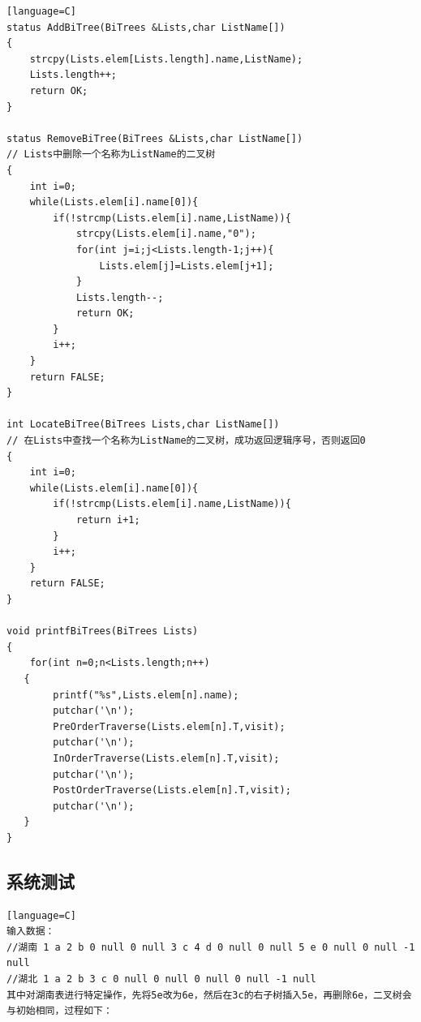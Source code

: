 \documentclass[supercite]{Experimental_Report}
\theoremstyle{definition}
\begin{document}
\begin{sloppypar}
\begin{lstlisting}[breaklines][language=C]
status AddBiTree(BiTrees &Lists,char ListName[])
{
    strcpy(Lists.elem[Lists.length].name,ListName);
    Lists.length++;
	return OK;
}

status RemoveBiTree(BiTrees &Lists,char ListName[])
// Lists中删除一个名称为ListName的二叉树
{
    int i=0;
    while(Lists.elem[i].name[0]){
        if(!strcmp(Lists.elem[i].name,ListName)){
        	strcpy(Lists.elem[i].name,"0");
            for(int j=i;j<Lists.length-1;j++){
                Lists.elem[j]=Lists.elem[j+1];
            }
            Lists.length--;
            return OK;
        }
        i++;
    }
    return FALSE;
}

int LocateBiTree(BiTrees Lists,char ListName[])
// 在Lists中查找一个名称为ListName的二叉树，成功返回逻辑序号，否则返回0
{
    int i=0;
    while(Lists.elem[i].name[0]){
        if(!strcmp(Lists.elem[i].name,ListName)){
            return i+1;
        }
        i++;
    }
    return FALSE;
}

void printfBiTrees(BiTrees Lists)
{
	for(int n=0;n<Lists.length;n++)
   {
   		printf("%s",Lists.elem[n].name);
		putchar('\n');
   		PreOrderTraverse(Lists.elem[n].T,visit);
		putchar('\n');
		InOrderTraverse(Lists.elem[n].T,visit);
		putchar('\n');
		PostOrderTraverse(Lists.elem[n].T,visit);
        putchar('\n');
   }
}

\end{lstlisting}

\subsection{系统测试}
\begin{lstlisting}[breaklines][language=C]
输入数据：
//湖南 1 a 2 b 0 null 0 null 3 c 4 d 0 null 0 null 5 e 0 null 0 null -1 null
//湖北 1 a 2 b 3 c 0 null 0 null 0 null 0 null -1 null
其中对湖南表进行特定操作，先将5e改为6e，然后在3c的右子树插入5e，再删除6e，二叉树会与初始相同，过程如下：
\end{lstlisting}
\begin{figure}[H]



\end{figure}
\end{sloppypar}
\end{document}
